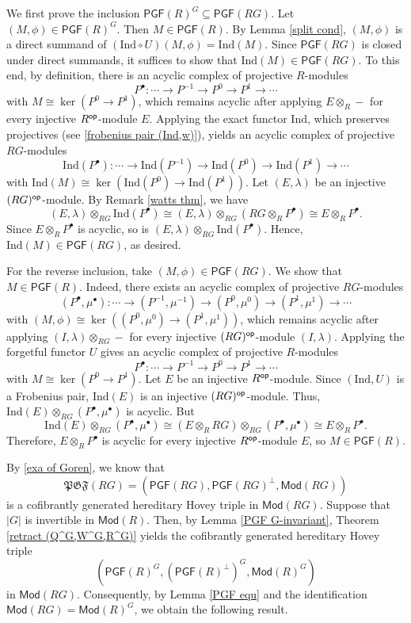 \documentclass[12pt,twoside]{amsart}
\theoremstyle{bfupright head,slanted body}
\theoremstyle{bfupright head,upright body}
\theoremstyle{fixed bf head,slanted body}
\theoremstyle{fixed bf head,upright body}
\theoremstyle{numbered paragraph}
\newenvironment{prf*}[1][Proof]{%
  \begin{proof}[\bf #1]
    \setcounter{equation}{0}
    \renewcommand{\theequation}{\arabic{equation}}}
  {\end{proof}
}
\numberwithin{equation}{res}
\newcommand{\PGF}{\mathsf{PGF}}
\newcommand{\Mod}{\mathsf{Mod}}
\newcommand{\Ind}{\mathrm{Ind}}
\newcommand{\Rop}{R^{\sf op}}
\newcommand{\op}{\sf op}
\begin{document}
\begin{prf*}
We first prove the inclusion \(\PGF(R)^G\subseteq\PGF(RG)\).
Let \((M,\phi)\in\PGF(R)^G\). Then \(M\in\PGF(R)\). By Lemma \ref{split cond}, \((M,\phi)\) is a direct summand of \((\Ind\circ U)(M,\phi)=\Ind(M)\). Since \(\PGF(RG)\) is closed under direct summands, it suffices to show that \(\Ind(M)\in\PGF(RG)\).
To this end, by definition, there is an acyclic complex of projective \(R\)-modules
\[
P^\bullet:\cdots\to P^{-1}\to P^0\to P^1\to\cdots
\]
with \(M\cong\ker(P^0\to P^1)\), which remains acyclic after applying \(E\otimes_R-\) for every injective \(\Rop\)-module \(E\). Applying the exact functor \(\Ind\), which preserves projectives (see \ref{frobenius pair (Ind,w)}), yields an acyclic complex of projective \(RG\)-modules
\[
\Ind(P^\bullet):\cdots\to \Ind(P^{-1})\to \Ind(P^0)\to \Ind(P^1)\to\cdots
\]
with \(\Ind(M)\cong\ker(\Ind(P^0)\to\Ind(P^1))\).
Let \((E,\lambda)\) be an injective \((RG)^{\op}\)-module. By Remark \ref{watts thm}, we have
\[
(E,\lambda)\otimes_{RG}\Ind(P^\bullet)
\cong (E,\lambda)\otimes_{RG}(RG\otimes_R P^\bullet)
\cong E\otimes_R P^\bullet.
\]
Since \(E\otimes_R P^\bullet\) is acyclic, so is \((E,\lambda)\otimes_{RG}\Ind(P^\bullet)\). Hence, \(\Ind(M)\in\PGF(RG)\), as desired.

For the reverse inclusion, take \((M,\phi)\in\PGF(RG)\). We show that \(M\in\PGF(R)\).
Indeed, there exists an acyclic complex of projective \(RG\)-modules
\[
(P^\bullet,\mu^\bullet):
\cdots\to (P^{-1},\mu^{-1})\to (P^0,\mu^0)\to (P^1,\mu^1)\to\cdots
\]
with \((M,\phi)\cong\ker((P^0,\mu^0)\to(P^1,\mu^1))\), which remains acyclic after applying \((I,\lambda)\otimes_{RG}-\) for every injective \((RG)^{\op}\)-module \((I,\lambda)\).
Applying the forgetful functor \(U\) gives an acyclic complex of projective \(R\)-modules
\[
P^\bullet:\cdots\to P^{-1}\to P^0\to P^1\to\cdots
\]
with \(M\cong\ker(P^0\to P^1)\).
Let \(E\) be an injective \(R^{\op}\)-module. Since \((\Ind,U)\) is a Frobenius pair, \(\Ind(E)\) is an injective \((RG)^{\op}\)-module. Thus, \(\Ind(E)\otimes_{RG}(P^\bullet,\mu^\bullet)\) is acyclic. But
\[
\Ind(E)\otimes_{RG}(P^\bullet,\mu^\bullet)
\cong (E\otimes_R RG)\otimes_{RG}(P^\bullet,\mu^\bullet)
\cong E\otimes_R P^\bullet.
\]
Therefore, \(E\otimes_R P^\bullet\) is acyclic for every injective \(R^{\op}\)-module \(E\), so \(M\in\PGF(R)\).
\end{prf*}

By \ref{exa of Goren}, we know that
\[
\mathfrak{PGF}(RG)=(\PGF(RG),\PGF(RG)^\bot,\Mod(RG))
\]
is a cofibrantly generated hereditary Hovey triple in \(\Mod(RG)\).
Suppose that \(|G|\) is invertible in \(\Mod(R)\).
Then, by Lemma \ref{PGF G-invariant}, Theorem \ref{retract (Q^G,W^G,R^G)} yields the cofibrantly generated hereditary Hovey triple
\[
(\PGF(R)^G,(\PGF(R)^\bot)^G,\Mod(R)^G)
\]
in \(\Mod(RG)\).
Consequently, by Lemma \ref{PGF equ} and the identification \(\Mod(RG)=\Mod(R)^G\), we obtain the following result.
\end{document}
